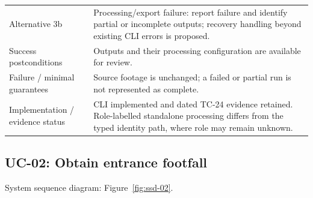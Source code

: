 \begin{longtable}{P{0.23\textwidth}P{0.67\textwidth}}
Alternative 3b & Processing/export failure: report failure and identify partial or incomplete outputs; recovery handling beyond existing CLI errors is proposed.\\
Success postconditions & Outputs and their processing configuration are available for review.\\
Failure / minimal guarantees & Source footage is unchanged; a failed or partial run is not represented as complete.\\
Implementation / evidence status & CLI implemented and dated TC-24 evidence retained. Role-labelled standalone processing differs from the typed identity path, where role may remain unknown.\\
\bottomrule
\end{longtable}

\subsection*{UC-02: Obtain entrance footfall}
\label{uc:02}
System sequence diagram: Figure~\ref{fig:ssd-02}.

